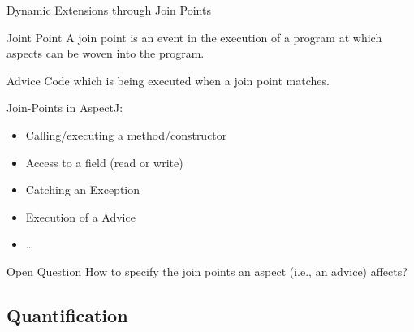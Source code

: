 \begin{frame}{Dynamic Extensions through Join Points}
	\begin{fancycolumns}[animation=none]
		\begin{definition}{Joint Point }
			A join point is an event in the execution of a program at which aspects can be woven into the program.
		\end{definition}
		\begin{definition}{Advice}
			Code which is being executed when a join point matches. 
		\end{definition}
		\begin{definition}{Join-Points in AspectJ:}
			\begin{itemize}
				\item Calling/executing a method/constructor
				\item Access to a field (read or write)
				\item Catching an Exception
				\item Execution of a Advice
				\item \ldots
			\end{itemize}
		\end{definition}
	\nextcolumn
		\begin{exampletight}{}
			\centering
		\end{exampletight}
		\pause
		\begin{note}{Open Question}		
			How to specify the join points an aspect (i.e., an advice) affects?
		\end{note}
	\end{fancycolumns}
\end{frame}

\subsection{Quantification}

